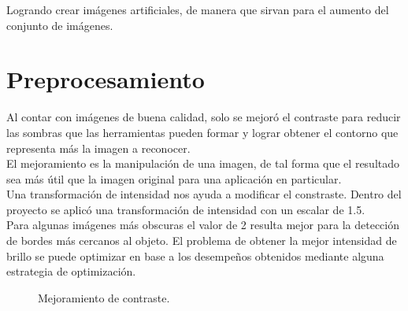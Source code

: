 \documentclass[a4paper, 11pt]{article}
\begin{document}
Logrando crear imágenes artificiales, de manera que sirvan para el aumento del conjunto de imágenes.\\

\pagebreak
\section{Preprocesamiento}

Al contar con imágenes de buena calidad, solo se mejoró el contraste para reducir las sombras que las herramientas pueden formar y lograr obtener el contorno que representa más la imagen a reconocer.\\

El mejoramiento es la manipulación de una imagen, de tal forma que el resultado sea más útil que la imagen original para una aplicación en particular.\\

Una transformación de intensidad nos ayuda a modificar el constraste. Dentro del proyecto se aplicó una transformación de intensidad con un escalar de 1.5.\\
Para algunas imágenes más obscuras el valor de 2 resulta mejor para la detección de bordes más cercanos al objeto. El problema de obtener la mejor intensidad de brillo se puede optimizar en base a los desempeños obtenidos mediante alguna estrategia de optimización.\\

\begin{figure}[ht]%
    \centering
    \qquad
    \caption{Mejoramiento de contraste.}%
    \label{fig:grayImage}%
\end{figure}
\end{document}
